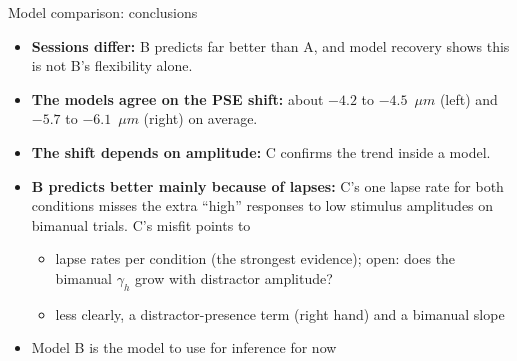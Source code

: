 \begin{frame}{Model comparison: conclusions}
  \begin{itemize}
    \item \textbf{Sessions differ:} B predicts far better than A, and model recovery shows this
          is not B's flexibility alone.
    \item \textbf{The models agree on the PSE shift:} about $-4.2$ to $-4.5$~$\mu m$ (left) and
          $-5.7$ to $-6.1$~$\mu m$ (right) on average.
    \item \textbf{The shift depends on amplitude:} C confirms the trend inside a model.
    \item \textbf{B predicts better mainly because of lapses:} C's one lapse rate for both
          conditions misses the extra ``high'' responses to low stimulus amplitudes on bimanual trials.
          C's misfit points to
    \begin{itemize}
      \item lapse rates per condition (the strongest evidence); open: does the bimanual
            $\gamma_h$ grow with distractor amplitude?
      \item less clearly, a distractor-presence term (right hand) and a bimanual slope
    \end{itemize}
    \item[$\Rightarrow$] Model B is the model to use for inference for now
  \end{itemize}
\end{frame}
